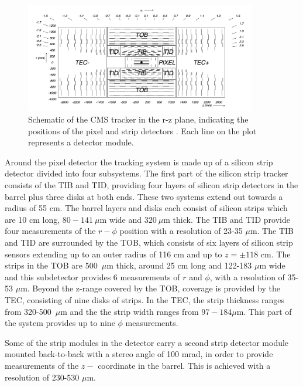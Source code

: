 \begin{figure}[h!]
\begin{center}
\includegraphics[width=0.9\textwidth]{./Detector/Plots/Tracker.png}
\caption[Schematic of the CMS tracker in the 
r-z plane, indicating the positions of the pixel and
strip detectors.]{Schematic of the CMS tracker in the r-z plane, indicating the
positions of the pixel and strip detectors \cite{cms-jinst}. Each line 
on the plot represents a detector module.}
\label{fig:CMS_tracker}
\end{center}
\end{figure}


Around the pixel detector the tracking system is made up of a silicon
strip detector divided into four subsystems. The first part of the
silicon strip tracker consists of the \ac{TIB} and \ac{TID}, providing four layers of
silicon strip detectors in the barrel plus three disks at both ends. These two systems
extend out towards a radius of 55 cm. The barrel layers and disks each consist
of silicon strips which are 10 cm long, $80-141~\mu$m wide and $320~\mu$m thick. The \ac{TIB} and \ac{TID}
provide four measurements of the $r-\phi$ position  with a resolution of 23-35 $\mu$m.
The \ac{TIB} and \ac{TID} are surrounded by the \ac{TOB}, which consists of six layers of silicon strip sensors extending
up to an outer radius of 116 cm and up to $z=\pm 118$ cm. The strips in the \ac{TOB} are 500~$\mu$m thick, around 25 cm long and 122-183 $\mu$m 
wide and this subdetector provides 6 measurements of $r$ and $\phi$, with a resolution
of 35-53 $\mu$m. Beyond the z-range covered by the \ac{TOB}, coverage is provided by the \ac{TEC},
consisting of nine disks of strips. In the \ac{TEC}, the strip thickness ranges from \mbox{320-500 $\mu$m} and the the strip width ranges from $97-184 \mu$m.
This part of the system provides up to nine $\phi$ measurements.

Some of the strip modules in the detector carry a second strip detector module mounted back-to-back with a stereo angle %
of 100 mrad, in order to provide measurements of the $z-$ coordinate in the barrel. This is achieved with a resolution of 230-530 $\mu$m.

